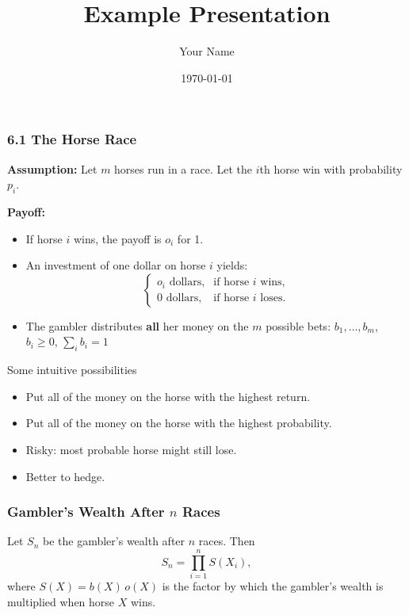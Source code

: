 \documentclass{beamer}
\title{Example Presentation}
\author{Your Name}
\date{\today}
\begin{document}
\begin{frame}[t]
  \frametitle{6.1 The Horse Race}
  \textbf{Assumption:} Let \(m\) horses run in a race. Let the \(i\)th horse win with probability \(p_i\).

  \vspace{1em}
  \textbf{Payoff:} 
  \begin{itemize}
    \item If horse \(i\) wins, the payoff is \(o_i\) for 1.
    \item An investment of one dollar on horse \(i\) yields:
    \[
      \begin{cases}
         o_i \text{ dollars,} & \text{if horse $i$ wins,}\\
         0 \text{ dollars,}   & \text{if horse $i$ loses.}
      \end{cases}
    \]
    \item The gambler distributes {\bf all} her money on the $m$ possible bets: $b_1,\ldots,b_m$, $b_i \geq 0$, $\sum_i b_i=1$
  \end{itemize}
\end{frame}

\begin{frame}{Some intuitive possibilities}
  \begin{itemize}
  \item Put all of the money on the horse with the highest return.
  \item Put all of the money on the horse with the highest probability.
  \item Risky: most probable horse might still lose.
    \item Better to hedge.
  \end{itemize}
\end{frame}

\begin{frame}
  \frametitle{Gambler's Wealth After \(n\) Races}
  
  Let \(S_n\) be the gambler's wealth after \(n\) races. Then
  \[
    S_n = \prod_{i=1}^n S(X_i),
  \]
  where \(S(X) = b(X)\,o(X)\) is the factor by which the gambler's wealth 
  is multiplied when horse \(X\) wins.
\end{frame}
\end{document}
